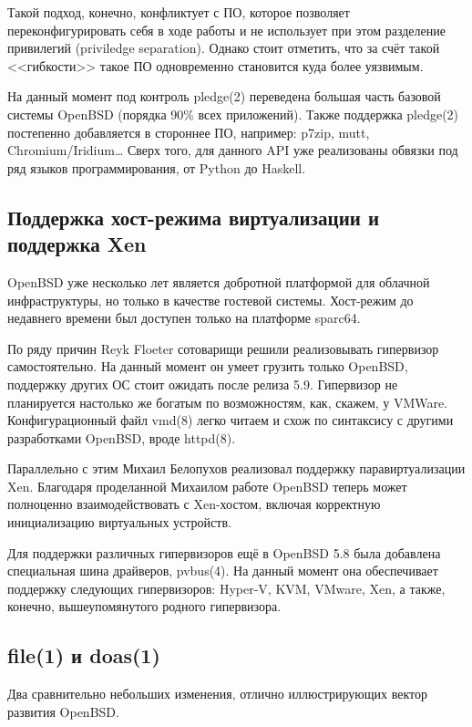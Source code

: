 \documentclass[10pt, a5paper]{article}
\begin{document}
Такой подход, конечно, конфликтует с ПО, которое позволяет переконфигурировать себя в ходе работы и не использует при этом разделение привилегий (priviledge separation). Однако стоит отметить, что за счёт такой <<гибкости>> такое ПО одновременно становится куда более уязвимым.

На данный момент под контроль pledge(2) переведена большая часть базовой системы OpenBSD (порядка 90\% всех приложений). Также поддержка pledge(2) постепенно добавляется в стороннее ПО, например: p7zip, mutt, Chromium/Iridium\ldots{} Сверх того, для данного API уже реализованы обвязки под ряд языков программирования, от Python до Haskell.

\subsection*{Поддержка хост-режима виртуализации и поддержка Xen}

OpenBSD уже несколько лет является добротной платформой для облачной инфраструктуры, но только в качестве гостевой системы. Хост-режим до недавнего времени был доступен только на платформе sparc64.

По ряду причин Reyk Floeter сотоварищи решили реализовывать гипервизор самостоятельно. На данный момент он умеет грузить только OpenBSD, поддержку других ОС стоит ожидать после релиза 5.9. Гипервизор не планируется настолько же богатым по возможностям, как, скажем, у VMWare. Конфигурационный файл vmd(8) легко читаем и схож по синтаксису с другими разработками OpenBSD, вроде httpd(8).

Параллельно с этим Михаил Белопухов реализовал поддержку паравиртуализации Xen. Благодаря проделанной Михаилом работе OpenBSD теперь может полноценно взаимодействовать с Xen-хостом, включая корректную инициализацию виртуальных \linebreak устройств.

Для поддержки различных гипервизоров ещё в OpenBSD 5.8 была добавлена специальная шина драйверов, pvbus(4). На данный момент она обеспечивает поддержку следующих гипервизоров: Hyper-V, KVM, VMware, Xen, а также, конечно, вышеупомянутого родного гипервизора.

\subsection*{file(1) и doas(1)}

Два сравнительно небольших изменения, отлично иллюстрирующих вектор развития OpenBSD.
\end{document}
